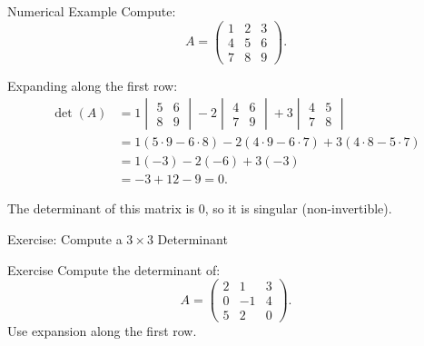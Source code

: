 \documentclass{beamer}
\begin{document}
	\begin{frame}{Numerical Example}
	Compute:
		\begin{equation}
		A =
		\begin{pmatrix} 
		1 & 2 & 3 \\ 
		4 & 5 & 6 \\ 
		7 & 8 & 9 
		\end{pmatrix}.
		\end{equation}
	
	Expanding along the first row:
		\begin{align}
		\det(A) &=
		1 
		\begin{vmatrix} 
		5 & 6 \\ 8 & 9 
		\end{vmatrix}
		- 2 
		\begin{vmatrix} 
		4 & 6 \\ 7 & 9 
		\end{vmatrix}
		+ 3 
		\begin{vmatrix} 
		4 & 5 \\ 7 & 8 
		\end{vmatrix} \\
		&= 1(5\cdot9 -6\cdot8) -2(4\cdot9 -6\cdot7) +3(4\cdot8 -5\cdot7) \\
		&= 1(-3) -2(-6) +3(-3) \\
		&= -3 +12 -9 = 0.
		\end{align}
	
	The determinant of this matrix is \(0\), so it is singular (non-invertible).
	\end{frame}

	\begin{frame}{Exercise: Compute a \(3 \times 3\) Determinant}
		\begin{block}{Exercise}
		Compute the determinant of:
			\begin{equation}
			A =
			\begin{pmatrix} 
			2 & 1 & 3 \\ 
			0 & -1 & 4 \\ 
			5 & 2 & 0 
			\end{pmatrix}.
			\end{equation}
		Use expansion along the first row.
		\end{block}
	\end{frame}
\end{document}
